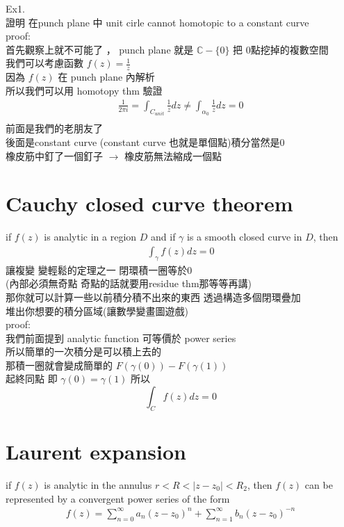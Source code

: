 \documentclass{article}
\begin{document}
Ex1.\\
證明 在punch plane 中 unit cirle cannot homotopic to a constant curve\\

proof:\\
首先觀察上就不可能了 ， punch plane 就是 $\mathbb{C} - \{0\}$ 把 0點挖掉的複數空間\\
我們可以考慮函數 $f(z) = \frac{1}{z}$\\
因為 $f(z)$ 在 punch plane 內解析\\
所以我們可以用 homotopy thm 驗證\\
\begin{align*}
    \frac{1}{2\pi i} = \int_{C_{unit}} \frac{1}{z} dz \neq \int_{\alpha_0} \frac{1}{z} dz = 0\\
\end{align*}
前面是我們的老朋友了\\
後面是constant curve (constant curve 也就是單個點)積分當然是0\\
橡皮筋中釘了一個釘子 $\rightarrow$ 橡皮筋無法縮成一個點\\        

\section{Cauchy closed curve theorem}
if $f(z)$ is analytic in a region $D$ and if $\gamma$ is a smooth closed curve in $D$, then
\begin{align*}
    \int_{\gamma} f(z) dz = 0
\end{align*}
讓複變 變輕鬆的定理之一 閉環積一圈等於0 \\
(內部必須無奇點 奇點的話就要用residue thm那等等再講)\\
那你就可以計算一些以前積分積不出來的東西 透過構造多個閉環疊加\\
堆出你想要的積分區域(讓數學變畫圖遊戲)\\

proof:\\
我們前面提到 analytic function 可等價於 power series\\
所以簡單的一次積分是可以積上去的\\
那積一圈就會變成簡單的 $F(\gamma(0))-F(\gamma(1))$ \\
起終同點 即 $\gamma(0)=\gamma(1)$ 所以\\
$$\int_{C} f(z) dz = 0$$

\section{Laurent expansion}
if $f(z)$ is analytic in the annulus $r<R<|z-z_0|<R_2$, then $f(z)$ can be represented by a convergent power series of the form
\begin{align*}
    f(z) = \sum_{n=0}^{\infty} a_{n}(z-z_0)^{n} + \sum_{n=1}^{\infty} b_{n}(z-z_0)^{-n}
\end{align*}
\end{document}
